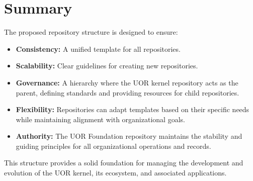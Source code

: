 \documentclass{article}
\begin{document}
\section*{Summary}
The proposed repository structure is designed to ensure:
\begin{itemize}
    \item \textbf{Consistency:} A unified template for all repositories.
    \item \textbf{Scalability:} Clear guidelines for creating new repositories.
    \item \textbf{Governance:} A hierarchy where the UOR kernel repository acts as the parent, defining standards and providing resources for child repositories.
    \item \textbf{Flexibility:} Repositories can adapt templates based on their specific needs while maintaining alignment with organizational goals.
    \item \textbf{Authority:} The UOR Foundation repository maintains the stability and guiding principles for all organizational operations and records.
\end{itemize}

This structure provides a solid foundation for managing the development and evolution of the UOR kernel, its ecosystem, and associated applications.
\end{document}
